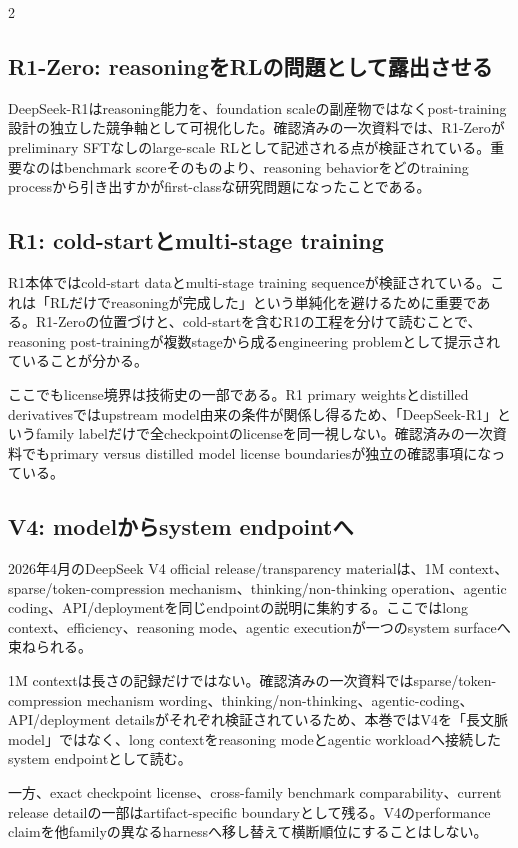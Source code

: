 \documentclass[lualatex,a4paper,10pt]{jlreq}
\begin{document}
\begin{multicols}{2}
\subsection{R1-Zero: reasoningをRLの問題として露出させる}
DeepSeek-R1はreasoning能力を、foundation scaleの副産物ではなくpost-training設計の独立した競争軸として可視化した。確認済みの一次資料では、R1-Zeroがpreliminary SFTなしのlarge-scale RLとして記述される点が検証されている。重要なのはbenchmark scoreそのものより、reasoning behaviorをどのtraining processから引き出すかがfirst-classな研究問題になったことである。\autocite{deepseekr1}

\subsection{R1: cold-startとmulti-stage training}
R1本体ではcold-start dataとmulti-stage training sequenceが検証されている。これは「RLだけでreasoningが完成した」という単純化を避けるために重要である。R1-Zeroの位置づけと、cold-startを含むR1の工程を分けて読むことで、reasoning post-trainingが複数stageから成るengineering problemとして提示されていることが分かる。\autocite{deepseekr1}

ここでもlicense境界は技術史の一部である。R1 primary weightsとdistilled derivativesではupstream model由来の条件が関係し得るため、「DeepSeek-R1」というfamily labelだけで全checkpointのlicenseを同一視しない。確認済みの一次資料でもprimary versus distilled model license boundariesが独立の確認事項になっている。

\subsection{V4: modelからsystem endpointへ}
2026年4月のDeepSeek V4 official release/transparency materialは、1M context、sparse/token-compression mechanism、thinking/non-thinking operation、agentic coding、API/deploymentを同じendpointの説明に集約する。ここではlong context、efficiency、reasoning mode、agentic executionが一つのsystem surfaceへ束ねられる。\autocite{deepseekv4}

1M contextは長さの記録だけではない。確認済みの一次資料ではsparse/token-compression mechanism wording、thinking/non-thinking、agentic-coding、API/deployment detailsがそれぞれ検証されているため、本巻ではV4を「長文脈model」ではなく、long contextをreasoning modeとagentic workloadへ接続したsystem endpointとして読む。\autocite{deepseekv4}

一方、exact checkpoint license、cross-family benchmark comparability、current release detailの一部はartifact-specific boundaryとして残る。V4のperformance claimを他familyの異なるharnessへ移し替えて横断順位にすることはしない。


\end{multicols}
\end{document}
